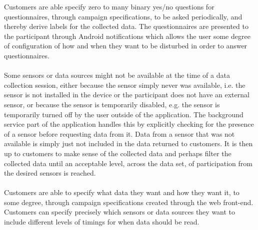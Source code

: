 Customers are able specify zero to many binary yes/no questions for questionnaires, through campaign specifications, to be asked periodically, and thereby derive labels for the collected data. The questionnaires are presented to the participant through Android notifications which allows the user some degree of configuration of how and when they want to be disturbed in order to answer questionnaires. 
\\\\
Some sensors or data sources might not be available at the time of a data collection session, either because the sensor simply never was available, i.e. the sensor is not installed in the device or the participant does not have an external sensor, or because the sensor is temporarily disabled, e.g. the sensor is temporarily turned off by the user outside of the application. The background service part of the application handles this by explicitly checking for the presence of a sensor before requesting data from it. Data from a sensor that was not available is simply just not included in the data returned to customers. It is then up to customers to make sense of the collected data and perhaps filter the collected data until an acceptable level, across the data set, of participation from the desired sensors is reached.
\\\\
Customers are able to specify what data they want and how they want it, to some degree, through campaign specifications created through the web front-end. Customers can specify precisely which sensors or data sources they want to include different levels of timings for when data should be read. 
\\\\
